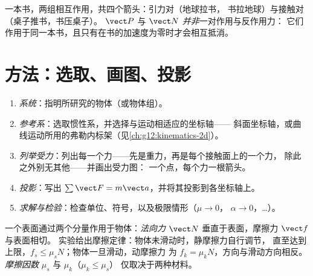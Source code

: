 \begin{omfigure}

{\small 一本书，两组相互作用，共四个箭头：引力对（地球拉书，
书拉地球）与接触对（桌子推书，书压桌子）。
$\vect P$ 与 $\vect N$ \emph{并非}一对作用与反作用力：
它们作用于同一本书，且只有在书的加速度为零时才会相互抵消。}
\end{omfigure}

\section{方法：选取、画图、投影}

\begin{method}[求解动力学问题]\label{met:g12:newtons-laws:method}
\begin{enumerate}
  \item \emph{系统}：指明所研究的物体（或物体组）。
  \item \emph{参考系}：选取惯性系，并选择与运动相适应的坐标轴——
        斜面坐标轴，或曲线运动所用的弗勒内标架（见\cref{ch:g12:kinematics-2d}）。
  \item \emph{列举受力}：列出每一个力——先是重力，再是每个接触面上的一个力，
        除此之外别无其他——并画出受力图：
        一个点，每个力一根箭头。
  \item \emph{投影}：写出 $\sum \vect F = m\vect a$，并将其投影到各坐标轴上。
  \item \emph{求解与检验}：检查单位、符号，以及极限情形（$\mu \to 0$，
        $\alpha \to 0$，\dots）。
\end{enumerate}
\end{method}

\begin{definition}[法向力与摩擦力]\label{def:g12:newtons-laws:friction}
一个表面通过两个分量作用于物体：\emph{法向力} $\vect N$ 垂直于表面，摩擦力 $\vect f$ 与表面相切。
实验给出摩擦定律：物体未滑动时，静摩擦力自行调节，
直至达到上限，$f_s \leq \mu_s N$；物体一旦滑动，动摩擦力
为 $f_k = \mu_k N$，方向与滑动方向相反。\emph{摩擦因数}%
 $\mu_s$ 与 $\mu_k$（$\mu_k \leq \mu_s$）
仅取决于两种材料。
\end{definition}

